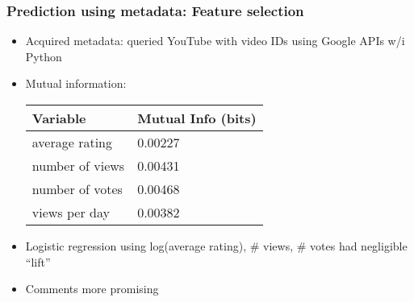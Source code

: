 \documentclass[fleqn]{beamer}
\begin{document}
\begin{frame}
\frametitle{Prediction using metadata: Feature selection}
      \begin{itemize}
      	\item Acquired metadata: queried YouTube with video IDs using Google APIs w/i Python
          \item Mutual information: \\
          		\begin{center}
        			\begin{tabular}{ | l | l |}
			\hline
			Variable & Mutual Info (bits) \\ \hline
			average rating & 0.00227\\ \hline
			number of views & 0.00431\\ \hline
			number of votes & 0.00468\\ \hline
			views per day & 0.00382 \\
			\hline
			\end{tabular}
					
      		\end{center}	
          \item Logistic regression using log(average rating), \# views, \# votes
                   had negligible ``lift''
          \item Comments more promising
      \end{itemize}

\end{frame}
\end{document}
